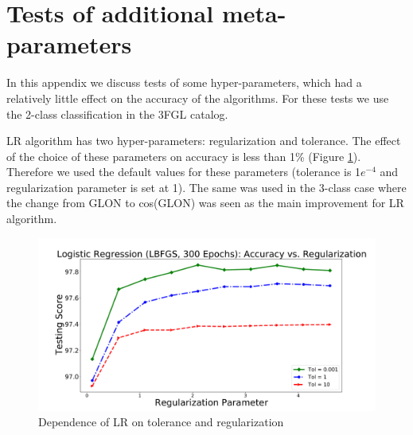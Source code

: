 \section{Tests of additional meta-parameters}

In this appendix we discuss tests of some hyper-parameters, which had a relatively little effect on the 
accuracy of the algorithms. For these tests we use the 2-class classification in the 3FGL catalog.

LR algorithm has two hyper-parameters: regularization and tolerance. 
The effect of the choice of these parameters on accuracy is less than 1\% (Figure \ref{fig:LR_tol_reg}). 
Therefore we used the default values for these parameters (tolerance is 1$e^{-4}$ and regularization parameter is set at 1). The same was used in the 3-class case where the change from GLON to cos(GLON) was seen as the main improvement for LR algorithm.
\begin{figure}[h]
\includegraphics[width=\twopicsp\textwidth]{plots/lr_train_reg.pdf}
\caption{Dependence of LR on tolerance and regularization}
\label{fig:LR_tol_reg}
\end{figure}

